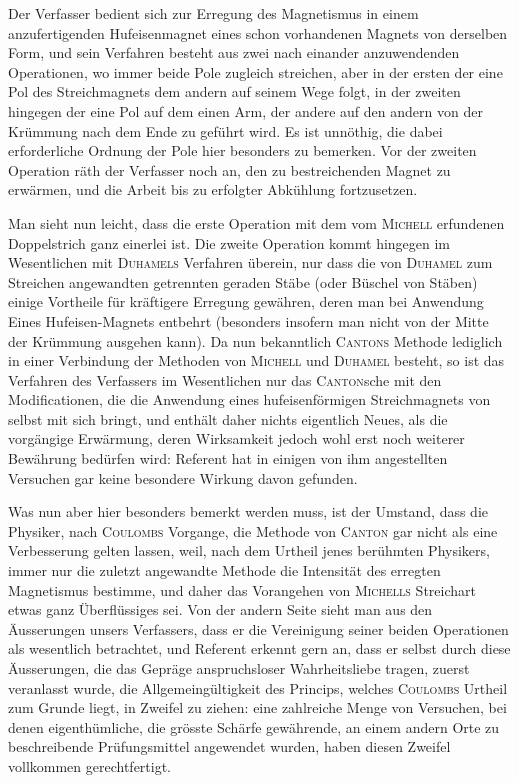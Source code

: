 Der Verfasser bedient sich zur Erregung des Magnetismus in einem anzufertigenden Hufeisenmagnet eines schon vorhandenen Magnets von derselben Form, und sein Verfahren besteht aus zwei nach einander anzuwendenden Operationen, wo immer beide Pole zugleich streichen, aber in der ersten der eine Pol des Streichmagnets dem andern auf seinem Wege folgt, in der zweiten hingegen der eine Pol auf dem einen Arm, der andere auf den andern von der Krümmung nach dem Ende zu geführt wird. Es ist unnöthig, die dabei erforderliche Ordnung der Pole hier besonders zu bemerken. Vor der zweiten Operation räth der Verfasser noch an, den zu bestreichenden Magnet zu erwärmen, und die Arbeit bis zu erfolgter Abkühlung fortzusetzen.

Man sieht nun leicht, dass die erste Operation mit dem vom \textsc{Michell} erfundenen Doppelstrich ganz einerlei ist. Die zweite Operation kommt hingegen im Wesentlichen mit \textsc{Duhamels} Verfahren überein, nur dass die von \textsc{Duhamel} zum Streichen angewandten getrennten geraden Stäbe (oder Büschel von Stäben) einige Vortheile für kräftigere Erregung gewähren, deren man bei Anwendung Eines Hufeisen-Magnets entbehrt (besonders insofern man nicht von der Mitte der Krümmung ausgehen kann). Da nun bekanntlich \textsc{Cantons} Methode lediglich in einer Verbindung der Methoden von \textsc{Michell} und \textsc{Duhamel} besteht, so ist das Verfahren des Verfassers im Wesentlichen nur das \textsc{Canton}sche mit den Modificationen, die die Anwendung eines hufeisenförmigen Streichmagnets von selbst mit sich bringt, und enthält daher nichts eigentlich Neues, als die vorgängige Erwärmung, deren Wirksamkeit jedoch wohl erst noch weiterer Bewährung bedürfen wird: Referent hat in einigen von ihm angestellten Versuchen gar keine besondere Wirkung davon gefunden.

Was nun aber hier besonders bemerkt werden muss, ist der Umstand, dass die Physiker, nach \textsc{Coulombs} Vorgange, die Methode von \textsc{Canton} gar nicht als eine Verbesserung gelten lassen, weil, nach dem Urtheil jenes berühmten Physikers, immer nur die zuletzt angewandte Methode die Intensität des erregten Magnetismus bestimme, und daher das Vorangehen von \textsc{Michells} Streichart etwas ganz Überflüssiges sei. Von der andern Seite sieht man aus den Äusserungen unsers Verfassers, dass er die Vereinigung seiner beiden Operationen als wesentlich betrachtet, und Referent erkennt gern an, dass er selbst durch diese Äusserungen, die das Gepräge anspruchsloser Wahrheitsliebe tragen, zuerst veranlasst wurde, die Allgemeingültigkeit des Princips, welches \textsc{Coulombs} Urtheil zum Grunde liegt, in Zweifel zu ziehen: eine zahlreiche Menge von Versuchen, bei denen eigenthümliche, die grösste Schärfe gewährende, an einem andern Orte zu beschreibende Prüfungsmittel angewendet wurden, haben diesen Zweifel vollkommen gerechtfertigt.

